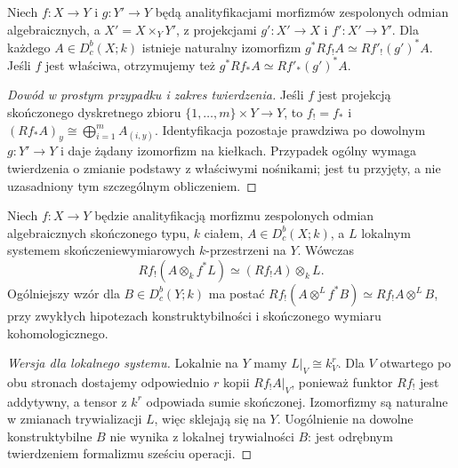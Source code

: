 \begin{twierdzenie}
\label{thm:xvi-basechange}
Niech $f:X\to Y$ i $g:Y'\to Y$ będą analityfikacjami
morfizmów zespolonych odmian algebraicznych, a
$X'=X\times_Y Y'$, z projekcjami
$g':X'\to X$ i $f':X'\to Y'$.
Dla każdego $A\in D^b_c(X;k)$ istnieje
naturalny izomorfizm
$g^*Rf_!A\simeq Rf'_!(g')^*A$.
Jeśli $f$ jest właściwa, otrzymujemy też
$g^*Rf_*A\simeq Rf'_*(g')^*A$.
\end{twierdzenie}
\begin{proof}[Dowód w prostym przypadku i zakres twierdzenia]
Jeśli $f$ jest projekcją skończonego dyskretnego zbioru
$\{1,\dots,m\}\times Y\to Y$, to $f_!=f_*$ i
$(Rf_*A)_y\cong\bigoplus_{i=1}^m A_{(i,y)}$.
Identyfikacja pozostaje prawdziwa po dowolnym
$g:Y'\to Y$ i daje żądany izomorfizm na kiełkach.
Przypadek ogólny wymaga twierdzenia o zmianie podstawy
z właściwymi nośnikami; jest tu przyjęty, a nie
uzasadniony tym szczególnym obliczeniem.
\end{proof}

\begin{twierdzenie}
\label{thm:xvi-projection}
Niech $f:X\to Y$ będzie analityfikacją morfizmu
zespolonych odmian algebraicznych skończonego typu,
$k$ ciałem, $A\in D^b_c(X;k)$, a $L$
lokalnym systemem skończeniewymiarowych
$k$-przestrzeni na $Y$. Wówczas
\[
Rf_!(A\otimes_k f^*L)\simeq (Rf_!A)\otimes_k L.
\]
Ogólniejszy wzór dla $B\in D^b_c(Y;k)$ ma postać
$Rf_!(A\otimes^L f^*B)\simeq Rf_!A\otimes^L B$,
przy zwykłych hipotezach konstruktybilności i
skończonego wymiaru kohomologicznego.
\end{twierdzenie}
\begin{proof}[Wersja dla lokalnego systemu]
Lokalnie na $Y$ mamy $L|_V\cong k_V^r$.
Dla $V$ otwartego po obu stronach dostajemy
odpowiednio $r$ kopii $Rf_!A|_V$, ponieważ
funktor $Rf_!$ jest addytywny, a tensor z $k^r$
odpowiada sumie skończonej. Izomorfizmy są naturalne
w zmianach trywializacji $L$, więc sklejają się na $Y$.
Uogólnienie na dowolne konstruktybilne $B$ nie wynika
z lokalnej trywialności $B$: jest odrębnym twierdzeniem
formalizmu sześciu operacji.
\end{proof}

